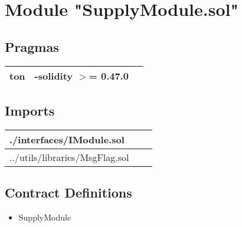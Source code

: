 
\section{Module "SupplyModule.sol"}


\subsection{Pragmas}


\noindent\begin{tabular}{|l|l|p{5cm}|}\hline
ton & -solidity $>$= 0.47.0 &\\\hline
\end{tabular}


\subsection{Imports}


\noindent\begin{tabular}{|l|l|p{5cm}|}\hline
./interfaces/IModule.sol &\\\hline
../utils/libraries/MsgFlag.sol &\\\hline
\end{tabular}


\subsection{Contract Definitions}

\begin{itemize}
\item SupplyModule
\end{itemize}
